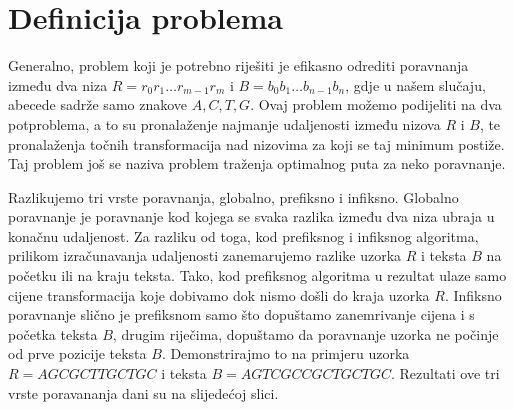 \documentclass[times, utf8, zavrsni]{fer}
\begin{document}
\section{Definicija problema}
Generalno, problem koji je potrebno riješiti je efikasno odrediti poravnanja između dva niza \(R = r_{0}r_{1}{\dots}r_{m-1}r_{m}\) i \(B = b_{0}b_{1}{\dots}b_{n-1}b_{n}\), gdje u našem slučaju, abecede sadrže samo znakove $A,C,T,G$. Ovaj problem možemo podijeliti na dva potproblema, a to su pronalaženje najmanje udaljenosti između nizova $R$ i $B$, te pronalaženja točnih transformacija nad nizovima za koji se taj minimum postiže. Taj problem još se naziva problem traženja optimalnog puta za neko poravnanje. 

Razlikujemo tri vrste poravnanja, globalno, prefiksno i infiksno. Globalno poravnanje je poravnanje kod kojega se svaka razlika između dva niza ubraja u konačnu udaljenost. Za razliku od toga, kod prefiksnog i infiksnog algoritma, prilikom izračunavanja udaljenosti zanemarujemo razlike uzorka $R$ i teksta $B$ na početku ili na kraju teksta. Tako, kod prefiksnog algoritma u rezultat ulaze samo cijene transformacija koje dobivamo dok nismo došli do kraja uzorka $R$. Infiksno poravnanje slično je prefiksnom samo što dopuštamo zanemrivanje cijena i s početka teksta $B$, drugim riječima, dopuštamo da poravnanje uzorka ne počinje od prve pozicije teksta $B$. Demonstrirajmo to na primjeru uzorka $R = AGCGCTTGCTGC$ i teksta $B = AGTCGCCGCTGCTGC$. Rezultati ove tri vrste poravananja dani su na slijedećoj slici.
\end{document}
